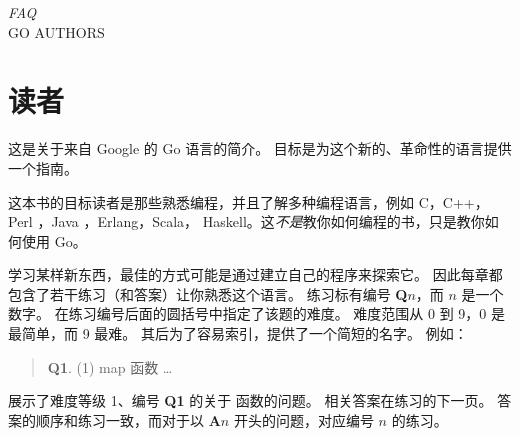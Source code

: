 {\textit{FAQ}\\ \textsc{GO AUTHORS}}

\section{读者}
\noindent{}这是关于来自 Google 的 Go 语言的简介。
目标是为这个新的、革命性的语言提供一个指南。

这本书的目标读者是那些熟悉编程，并且了解多种编程语言，例如 C\cite{c}，C++\cite{c++}，
Perl \cite{perl}，Java \cite{java}，Erlang\cite{erlang}，Scala\cite{scala}，
Haskell\cite{haskell}。这\emph{不是}教你如何编程的书，只是教你如何使用 Go。

学习某样新东西，最佳的方式可能是通过建立自己的程序来探索它。
因此每章都包含了若干练习（和答案）让你熟悉这个语言。
练习标有编号 \textbf{Q$n$}，而 $n$ 是一个数字。 
在练习编号后面的圆括号中指定了该题的难度。
难度范围从 0 到 9，0 是最简单，而 9 最难。
其后为了容易索引，提供了一个简短的名字。
例如：
\begin{verse}
\textbf{Q1}. (1) map 函数 \ldots
\end{verse}
展示了难度等级 1、编号 \textbf{Q1} 的关于  函数的问题。
相关答案在练习的下一页。
答案的顺序和练习一致，而对于以 \textbf{A$n$} 开头的问题，对应编号 $n$ 的练习。

